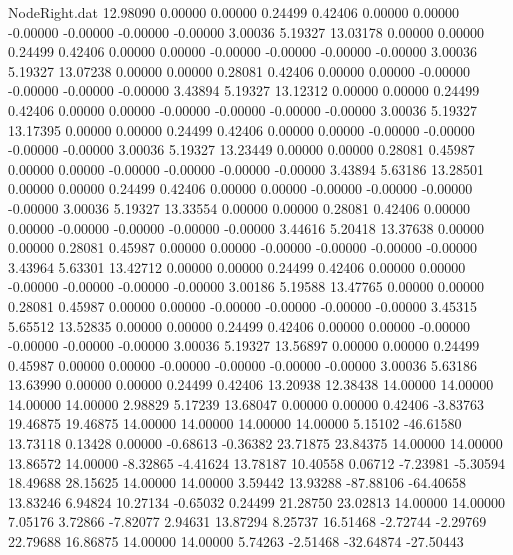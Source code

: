 \begin{filecontents}{NodeRight.dat}
  12.98090    0.00000    0.00000     0.24499    0.42406    0.00000    0.00000   -0.00000   -0.00000   -0.00000   -0.00000    3.00036    5.19327
  13.03178    0.00000    0.00000     0.24499    0.42406    0.00000    0.00000   -0.00000   -0.00000   -0.00000   -0.00000    3.00036    5.19327
  13.07238    0.00000    0.00000     0.28081    0.42406    0.00000    0.00000   -0.00000   -0.00000   -0.00000   -0.00000    3.43894    5.19327
  13.12312    0.00000    0.00000     0.24499    0.42406    0.00000    0.00000   -0.00000   -0.00000   -0.00000   -0.00000    3.00036    5.19327
  13.17395    0.00000    0.00000     0.24499    0.42406    0.00000    0.00000   -0.00000   -0.00000   -0.00000   -0.00000    3.00036    5.19327
  13.23449    0.00000    0.00000     0.28081    0.45987    0.00000    0.00000   -0.00000   -0.00000   -0.00000   -0.00000    3.43894    5.63186
  13.28501    0.00000    0.00000     0.24499    0.42406    0.00000    0.00000   -0.00000   -0.00000   -0.00000   -0.00000    3.00036    5.19327
  13.33554    0.00000    0.00000     0.28081    0.42406    0.00000    0.00000   -0.00000   -0.00000   -0.00000   -0.00000    3.44616    5.20418
  13.37638    0.00000    0.00000     0.28081    0.45987    0.00000    0.00000   -0.00000   -0.00000   -0.00000   -0.00000    3.43964    5.63301
  13.42712    0.00000    0.00000     0.24499    0.42406    0.00000    0.00000   -0.00000   -0.00000   -0.00000   -0.00000    3.00186    5.19588
  13.47765    0.00000    0.00000     0.28081    0.45987    0.00000    0.00000   -0.00000   -0.00000   -0.00000   -0.00000    3.45315    5.65512
  13.52835    0.00000    0.00000     0.24499    0.42406    0.00000    0.00000   -0.00000   -0.00000   -0.00000   -0.00000    3.00036    5.19327
  13.56897    0.00000    0.00000     0.24499    0.45987    0.00000    0.00000   -0.00000   -0.00000   -0.00000   -0.00000    3.00036    5.63186
  13.63990    0.00000    0.00000     0.24499    0.42406   13.20938   12.38438   14.00000   14.00000   14.00000   14.00000    2.98829    5.17239
  13.68047    0.00000    0.00000     0.42406   -3.83763   19.46875   19.46875   14.00000   14.00000   14.00000   14.00000    5.15102  -46.61580
  13.73118    0.13428    0.00000    -0.68613   -0.36382   23.71875   23.84375   14.00000   14.00000   13.86572   14.00000   -8.32865   -4.41624
  13.78187   10.40558    0.06712    -7.23981   -5.30594   18.49688   28.15625   14.00000   14.00000    3.59442   13.93288  -87.88106  -64.40658
  13.83246    6.94824   10.27134    -0.65032    0.24499   21.28750   23.02813   14.00000   14.00000    7.05176    3.72866   -7.82077    2.94631
  13.87294    8.25737   16.51468    -2.72744   -2.29769   22.79688   16.86875   14.00000   14.00000    5.74263   -2.51468  -32.64874  -27.50443

\end{filecontents}

